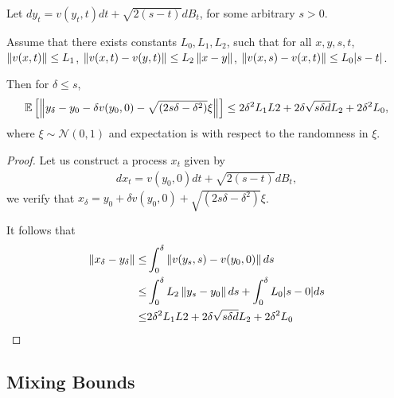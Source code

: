 \begin{lemma}
    Let $dy_t = v(y_t,t) dt + \sqrt{2(s-t)} dB_t$, for some arbitrary $s>0$. 
    
    Assume that there exists constants $L_0,L_1,L_2$, such that for all $x,y,s,t$, $\left\| v(x,t) \right\| \leq L_1$, $\left\| v(x,t) - v(y,t) \right\|\leq L_2\left\| x-y \right\|$, $\left\| v(x,s) - v(x,t) \right\|\leq L_0 |s-t|$.
    
    Then for $\delta\leq s$, 
    \begin{align*}
        \mathbb{E}\left[ {\left\| y_\delta - y_0 - \delta v(y_0,0) - \sqrt{(2s\delta - \delta^2)}  \xi \right\|} \right] \leq 2\delta^2 L_1 L2 + 2 \delta \sqrt{s\delta d} L_2 + 2 \delta^2 L_0,
    \end{align*}
     where $\xi \sim \mathcal{N}(0,1)$ and expectation is with respect to the randomness in $\xi$. 
\end{lemma}
\begin{proof}
    Let us construct a process $x_t$ given by
    \begin{align*}
        d x_t = v(y_0,0) dt + \sqrt{2(s-t)} dB_t,
    \end{align*}
    we verify that $x_\delta = y_0 + \delta v(y_0,0) + \sqrt{(2s\delta - \delta^2)}  \xi$.

    It follows that
    \begin{align*}
        \left\| x_\delta - y_\delta \right\| 
        \leq& \int_0^\delta \left\| v(y_s,s) - v(y_0,0) \right\| ds\\
        \leq& \int_0^\delta L_2 \left\| y_s - y_0 \right\| ds + \int_0^\delta L_0 |s-0| ds\\
        \leq& 2\delta^2 L_1 L2 + 2 \delta \sqrt{s\delta d} L_2 + 2 \delta^2 L_0
    \end{align*}
    
\end{proof}
\fi
\subsection{Mixing Bounds}
\label{ss:hitting-time-bound}

